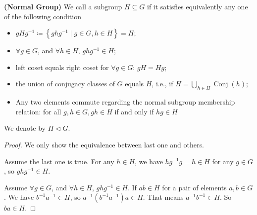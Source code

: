\documentclass{article}
\newcommand{\bfs}[1]{\textbf{({#1}) }}
\newcommand{\Conj}{\operatorname{Conj}}
\begin{document}
\begin{defa}{\bfs{Normal Group}}
 We call a subgroup $H \subseteq G$  if it satisfies equivalently any one of the following condition 
 \begin{itemize}
     \item $g H g^{-1}\coloneqq\left\{g h g^{-1} \mid g\in G, h \in H\right\}=H$;  
     \item  $\forall g\in G$, and $\forall h \in H$, $g h g^{-1}\in H$;
     \item left coset equals right coset for $\forall g \in G$: $gH=Hg$;
     \item  the union of conjugacy classes of $G$ equals $H$, i.e., if $H=\bigcup_{h\in H}\Conj(h)$;
     \item Any two elements commute regarding the normal subgroup membership relation: for all $g, h \in G, g h \in H$ if and only if $h g \in H$
 \end{itemize}
 We denote  by $H \triangleleft G .$
\begin{proof}
We only show the equivalence between last one and others.

Assume the last one is true. For any $h\in H$, we have $hg^{-1}g=h\in H$ for any $g\in G$, so $ghg^{-1}\in H$.


Assume $\forall g\in G$, and $\forall h \in H$, $g h g^{-1}\in H$. If $ab\in H$ for a pair of elements $a,b\in G$. We have $b^{-1}a^{-1}\in H$, so $a^{-1}(b^{-1}a^{-1})a\in H$. That means $a^{-1}b^{-1}\in H$. So $ba\in H$.
\end{proof}

\end{defa} 
\end{document}
